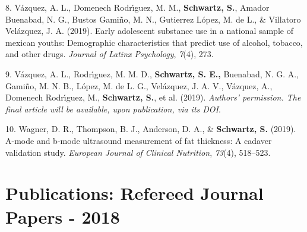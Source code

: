 \documentclass[11pt,a4paper,]{moderncv}
\newlength{\cslhangindent}
\newenvironment{CSLReferences}[2] %
 {\begin{list}{}{%
  \setlength{\itemindent}{0pt}
  \setlength{\leftmargin}{0pt}
  \setlength{\parsep}{0pt}
  \ifodd #1
   \setlength{\leftmargin}{\cslhangindent}
   \setlength{\itemindent}{-1\cslhangindent}
  \fi
  \setlength{\itemsep}{#2\baselineskip}}}
 {\end{list}}
\begin{document}
\begin{CSLReferences}{1}{0}
8. Vázquez, A. L., Domenech Rodrı́guez, M. M., \textbf{Schwartz, S.},
Amador Buenabad, N. G., Bustos Gamiño, M. N., Gutierrez López, M. de L.,
\& Villatoro Velázquez, J. A. (2019). Early adolescent substance use in
a national sample of mexican youths: Demographic characteristics that
predict use of alcohol, tobacco, and other drugs. \emph{Journal of
Latinx Psychology}, \emph{7}(4), 273.

9. Vázquez, A. L., Rodrı́guez, M. M. D., \textbf{Schwartz, S. E.,}
Buenabad, N. G. A., Gamiño, M. N. B., López, M. de L. G., Velázquez, J.
A. V., Vázquez, A., Domenech Rodrı́guez, M., \textbf{Schwartz, S.}, et
al. (2019). \emph{Authors' permission. The final article will be
available, upon publication, via its DOI}.

10. Wagner, D. R., Thompson, B. J., Anderson, D. A., \&
\textbf{Schwartz, S.} (2019). A-mode and b-mode ultrasound measurement
of fat thickness: A cadaver validation study. \emph{European Journal of
Clinical Nutrition}, \emph{73}(4), 518--523.

\end{CSLReferences}

\endgroup

\vspace{7mm}

\section{Publications: Refereed Journal Papers -
2018}\label{publications-refereed-journal-papers---2018}

\begingroup
\setlength{\parindent}{-0.5in}
\setlength{\leftskip}{0.5in}
\end{document}
